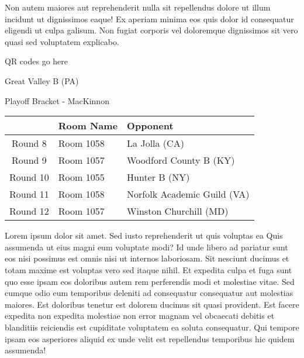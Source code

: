 \documentclass{article}%
\begin{document}
\newline%
Non autem maiores aut reprehenderit nulla sit repellendus dolore ut illum incidunt ut dignissimos eaque! Ex aperiam minima eos quis dolor id consequatur eligendi ut culpa galisum. Non fugiat corporis vel doloremque dignissimos sit vero quasi sed voluptatem explicabo.\newline%
\newline%
%
\vspace*{30pt}%
\begin{center}%
\begin{Huge}%
QR codes go here%
\end{Huge}%
\end{center}%
\newpage%
\begin{center}%
\begin{Huge}%
Great Valley B (PA)%
\end{Huge}%
\vspace*{8pt}%
\linebreak%
\begin{Large}%
Playoff Bracket {-} MacKinnon%
\end{Large}%
\end{center}%
\begin{tabularx}{\textwidth}{|c|Y|Y|}%
\hline%
&Room Name&Opponent\\%
\hline%
Round 8&Room 1058&La Jolla (CA)\\%
Round 9&Room 1057&Woodford County B (KY)\\%
Round 10&Room 1055&Hunter B (NY)\\%
Round 11&Room 1058&Norfolk Academic Guild (VA)\\%
Round 12&Room 1057&Winston Churchill (MD)\\%
\hline%
\end{tabularx}%
\vspace*{8pt}%
\linebreak%
\newline%
\newline%
Lorem ipsum dolor sit amet. Sed iusto reprehenderit ut quis voluptas ea Quis assumenda ut eius magni eum voluptate modi? Id unde libero ad pariatur sunt eos nisi possimus est omnis nisi ut internos laboriosam. Sit nesciunt ducimus et totam maxime est voluptas vero sed itaque nihil. Et expedita culpa et fuga sunt quo esse ipsam eos doloribus autem rem perferendis modi et molestiae vitae.\newline%
\newline%
Sed cumque odio eum temporibus deleniti ad consequatur consequatur aut molestias maiores. Est doloribus tenetur est dolorem ducimus sit quasi provident. Est facere expedita non expedita molestiae non error magnam vel obcaecati debitis et blanditiis reiciendis est cupiditate voluptatem ea soluta consequatur. Qui tempore ipsam eos asperiores aliquid ex unde velit est repellendus temporibus hic quidem assumenda!\newline%
\end{document}

